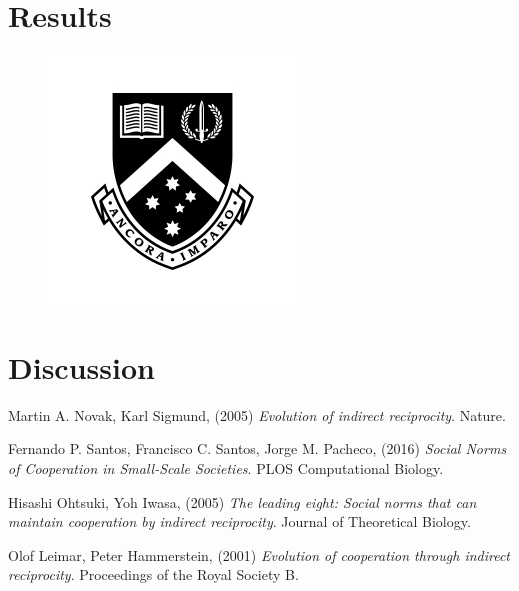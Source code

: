 \documentclass[10pt,a4paper]{article}
\begin{document}
\section{Results}
\begin{figure}[h!]
  \includegraphics[width=\linewidth]{images/monash_emblem.jpg}
  \caption{}
  \label{fig:Runtime1}
\end{figure}

\section{Discussion}

\begin{thebibliography}{9}

Martin A. Novak, Karl Sigmund, (2005) 
\textit{Evolution of indirect reciprocity}. 
Nature.

Fernando P. Santos, Francisco C. Santos, Jorge M. Pacheco, (2016) 
\textit{Social Norms of Cooperation in Small-Scale Societies}. 
PLOS Computational Biology.

Hisashi Ohtsuki, Yoh Iwasa, (2005) 
\textit{The leading eight: Social norms that can maintain cooperation by indirect reciprocity}. 
Journal of Theoretical Biology.

Olof Leimar, Peter Hammerstein, (2001) 
\textit{Evolution of cooperation through indirect reciprocity}. 
Proceedings of the Royal Society B.

\end{thebibliography}
\end{document}
